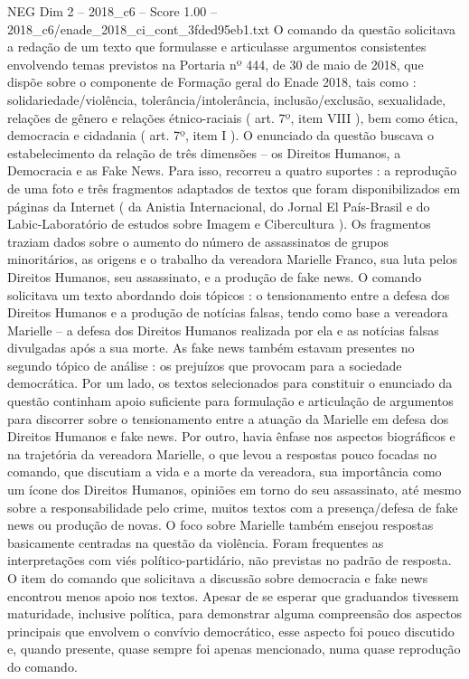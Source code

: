 \begin{textsample}{NEG Dim 2 – 2018\_c6 – Score 1.00 – 2018\_c6/enade\_2018\_ci\_cont\_3fded95eb1.txt}
O comando da questão solicitava a redação de um texto que formulasse e articulasse argumentos consistentes envolvendo temas previstos na Portaria nº 444, de 30 de maio de 2018, que dispõe sobre o componente de Formação geral do Enade 2018, tais como : solidariedade/violência, tolerância/intolerância, inclusão/exclusão, sexualidade, relações de gênero e relações étnico-raciais ( art. 7º, item VIII ), bem como ética, democracia e cidadania ( art. 7º, item I ).
O enunciado da questão buscava o estabelecimento da relação de três dimensões – os Direitos Humanos, a Democracia e as Fake News.
Para isso, recorreu a quatro suportes : a reprodução de uma foto e três fragmentos adaptados de textos que foram disponibilizados em páginas da Internet ( da Anistia Internacional, do Jornal El País-Brasil e do Labic-Laboratório de estudos sobre Imagem e Cibercultura ).
Os fragmentos traziam dados sobre o aumento do número de assassinatos de grupos minoritários, as origens e o trabalho da vereadora Marielle Franco, sua luta pelos Direitos Humanos, seu assassinato, e a produção de fake news.
O comando solicitava um texto abordando dois tópicos : o tensionamento entre a defesa dos Direitos Humanos e a produção de notícias falsas, tendo como base a vereadora Marielle – a defesa dos Direitos Humanos realizada por ela e as notícias falsas divulgadas após a sua morte.
As fake news também estavam presentes no segundo tópico de análise : os prejuízos que provocam para a sociedade democrática.
Por um lado, os textos selecionados para constituir o enunciado da questão continham apoio suficiente para formulação e articulação de argumentos para discorrer sobre o tensionamento entre a atuação da Marielle em defesa dos Direitos Humanos e fake news.
Por outro, havia ênfase nos aspectos biográficos e na trajetória da vereadora Marielle, o que levou a respostas pouco focadas no comando, que discutiam a vida e a morte da vereadora, sua importância como um ícone dos Direitos Humanos, opiniões em torno do seu assassinato, até mesmo sobre a responsabilidade pelo crime, muitos textos com a presença/defesa de fake news ou produção de novas.
O foco sobre Marielle também ensejou respostas basicamente centradas na questão da violência.
Foram frequentes as interpretações com viés político-partidário, não previstas no padrão de resposta.
O item do comando que solicitava a discussão sobre democracia e fake news encontrou menos apoio nos textos.
Apesar de se esperar que graduandos tivessem maturidade, inclusive política, para demonstrar alguma compreensão dos aspectos principais que envolvem o convívio democrático, esse aspecto foi pouco discutido e, quando presente, quase sempre foi apenas mencionado, numa quase reprodução do comando.

\end{textsample}
